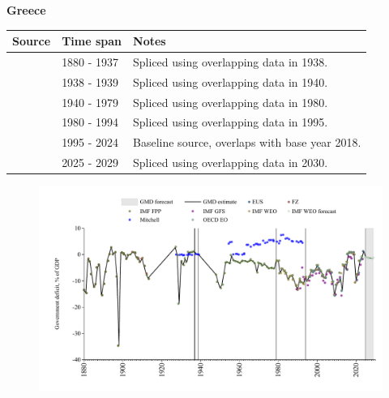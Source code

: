 \documentclass[12pt,a4paper,landscape]{article}
\begin{document}
\begin{adjustbox}{max totalsize={\paperwidth}{\paperheight},center}
\begin{minipage}[t][\textheight][t]{\textwidth}
\vspace*{0.5cm}
{}
\begin{center}
{\Large\bfseries Greece}
\end{center}
\vspace{0.5cm}
\begin{table}[H]
\centering
\small
\begin{tabular}{|l|l|l|}
\hline
\textbf{Source} & \textbf{Time span} & \textbf{Notes} \\
\hline
\rowcolor{white}\cite{IMF_FPP}& 1880 - 1937 &Spliced using overlapping data in 1938.\\
\rowcolor{lightgray}\cite{Mitchell}& 1938 - 1939 &Spliced using overlapping data in 1940.\\
\rowcolor{white}\cite{IMF_FPP}& 1940 - 1979 &Spliced using overlapping data in 1980.\\
\rowcolor{lightgray}\cite{IMF_WEO}& 1980 - 1994 &Spliced using overlapping data in 1995.\\
\rowcolor{white}\cite{EUS}& 1995 - 2024 &Baseline source, overlaps with base year 2018.\\
\rowcolor{lightgray}\cite{IMF_WEO_forecast}& 2025 - 2029 &Spliced using overlapping data in 2030.\\
\hline
\end{tabular}
\end{table}
\begin{figure}[H]
\centering
\includegraphics[width=\textwidth,height=0.6\textheight,keepaspectratio]{graphs/GRC_govdef_GDP.pdf}
\end{figure}
\end{minipage}
\end{adjustbox}
\end{document}

